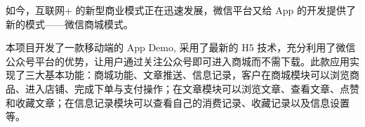 
\begin{chineseabstract}
  如今，互联网+ 的新型商业模式正在迅速发展，微信平台又给 App 的开发提供了新的模式——微信商城模式。
  \par
  本项目开发了一款移动端的 App Demo, 采用了最新的 H5 技术，充分利用了微信公众号平台的优势，让用户通过关注公众号即可进入商城而不需下载。此款应用实现了三大基本功能：商城功能、文章推送、信息记录，客户在商城模块可以浏览商品、进入店铺、完成下单与支付操作；在文章模块可以浏览文章、查看文章、点赞和收藏文章；在信息记录模块可以查看自己的消费记录、收藏记录以及信息设置等。
\end{chineseabstract}

